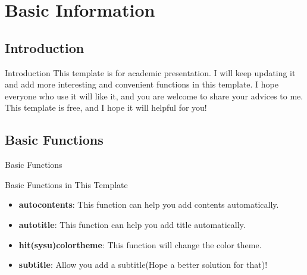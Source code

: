 \section{Basic Information}
\subsection{Introduction}
\begin{frame}{Introduction}
    This template is for academic presentation. I will keep updating it and add more interesting and convenient functions in this template. I hope everyone who use it will like it, and you are welcome to share your advices to me. This template is free, and I hope it will helpful for you!
\end{frame}

\subsection{Basic Functions}
\begin{frame}{Basic Functions}
\begin{block}{Basic Functions in This Template}
\begin{itemize}
    \item \textbf{autocontents}: This function can help you add contents automatically.
    \item \textbf{autotitle}: This function can help you add title automatically.
    \item \textbf{hit(sysu)colortheme}: This function will change the color theme.
    \item \textbf{subtitle}: Allow you add a subtitle(Hope a better solution for that)!
\end{itemize}
\end{block}
\end{frame}
